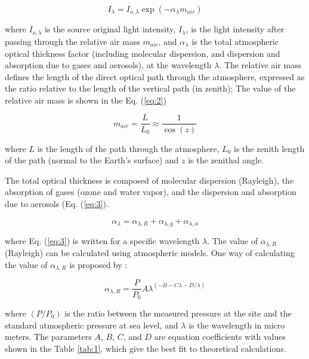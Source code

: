\documentclass[12pt,letterpaper]{article}
\numberwithin{figure}{section}
\numberwithin{equation}{section}
\numberwithin{table}{section}
\begin{document}
\begin{equation}
    I_\lambda=I_{o,\lambda}\exp(-\alpha_\lambda m_{air})
    \label{eq:1}
\end{equation}

where $I_{o,\lambda}$ is the source original light intensity, $I_\lambda$, is the light intensity after passing through the relative air mass $m_{air}$, and $\alpha_\lambda$ is the total atmospheric optical thickness factor (including molecular dispersion, and dispersion and absorption due to gases and aerosols), at the wavelength $\lambda$. The relative air mass defines the length of the direct optical path through the atmosphere, expressed as the ratio relative to the length of the vertical path (in zenith); The value of the relative air mass is shown in the Eq. (\ref {eq:2})

\begin{equation}
    m_{air}=\frac{L}{L_0}\approx\frac{1}{\cos(z)}
    \label{eq:2}
\end{equation}


where $L$ is the length of the path through the atmosphere, $L_0$ is the zenith length of the path (normal to the Earth's surface) and $z$ is the zenithal angle.

The total optical thickness is composed of molecular dispersion (Rayleigh), the absorption of gases (ozone and water vapor), and the dispersion and absorption due to aerosols (Eq. (\ref{eq:3}).

\begin{equation}
    \alpha_\lambda = \alpha_{\lambda,R} + \alpha_{\lambda,g} + \alpha_{\lambda,a}
    \label{eq:3}
\end{equation}

where Eq. (\ref{eq:3}) is written for a specific wavelength $\lambda$. The value of $\alpha_{\lambda,R}$ (Rayleigh) can be calculated using atmospheric models. One way of calculating the value of $\alpha_{\lambda,R}$ is proposed by \cite{Bucholtz}:

\begin{equation}
    \alpha_{\lambda,R} = \frac{P}{P_0}A\lambda^{(-B-C\lambda-D/\lambda)}
    \label{eq:4}
\end{equation}

where $(P/P_0)$ is the ratio between the measured pressure at the site and the standard atmospheric pressure at sea level, and $\lambda$ is the wavelength in micro meters. The parameters $A$, $B$, $C$, and $D$ are equation coefficients with values shown in the Table \ref{tab:1}, which give the best fit to theoretical calculations.
\end{document}
